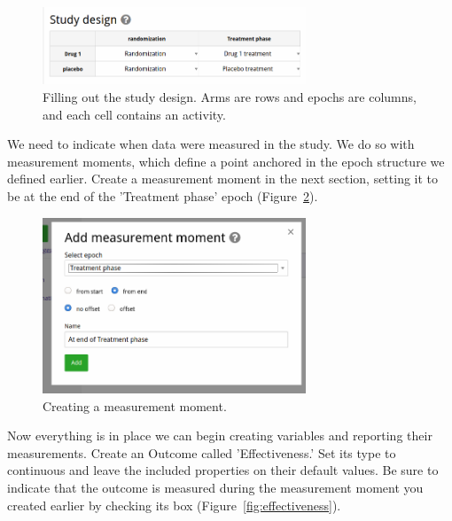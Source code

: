\documentclass[12pt]{article}
\begin{document}
\begin{figure}[!ht]
  \centering
  \includegraphics[width=0.7\textwidth]{img/studyDesign.png}
  \caption{Filling out the study design.
  Arms are rows and epochs are columns, and each cell contains an activity.}
\label{fig:studyDesign}
\end{figure}

We need to indicate when data were measured in the study.
We do so with measurement moments, which define a point anchored in the epoch structure we defined earlier.
Create a measurement moment in the next section, setting it to be at the end of the 'Treatment phase' epoch (Figure~\ref{fig:addMeasurementMoment}).

\begin{figure}[!ht]
  \centering
  \includegraphics[width=0.7\textwidth]{img/addMeasurementMoment.png}
  \caption{Creating a measurement moment.}
\label{fig:addMeasurementMoment}
\end{figure}

Now everything is in place we can begin creating variables and reporting their measurements.
Create an Outcome called 'Effectiveness.'
Set its type to continuous and leave the included properties on their default values.
Be sure to indicate that the outcome is measured during the measurement moment you created earlier by checking its box (Figure~\ref{fig:effectiveness}).
\end{document}
